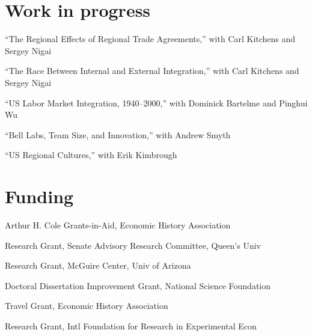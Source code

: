 \documentclass[11pt,letterpaper]{article}
\begin{document}
\vspace{-1em}
\section*{Work in progress}

\begin{description}[leftmargin=0in,itemsep=.25em,itemindent=.15in]
\item ``The Regional Effects of Regional Trade Agreements,'' with Carl Kitchens and Sergey Nigai
\item ``The Race Between Internal and External Integration,'' with Carl Kitchens and Sergey Nigai
\item ``US Labor Market Integration, 1940--2000,'' with Dominick Bartelme and Pinghui Wu
\item 	``Bell Labs, Team Size, and Innovation,'' with Andrew Smyth
\item 	``US Regional Cultures,'' with Erik Kimbrough
\end{description} 

\vspace{-1em}
\section*{Funding}

\begin{description}[leftmargin=.75in,itemsep=.25em,itemindent=0in]
\item[2015]			Arthur H. Cole Grants-in-Aid, Economic History Association%
\item[2015]			Research Grant, Senate Advisory Research Committee, Queen's Univ%
\item[2013 - 14] 	Research Grant, McGuire Center, Univ of Arizona%
\item[2012 - 14] 	Doctoral Dissertation Improvement Grant, National Science Foundation%
\item[2011] 		Travel Grant, Economic History Association%
\item[2009 - 11] 	Research Grant, Intl Foundation for Research in Experimental Econ%
\end{description}

\vspace{-1em}
\end{document}
